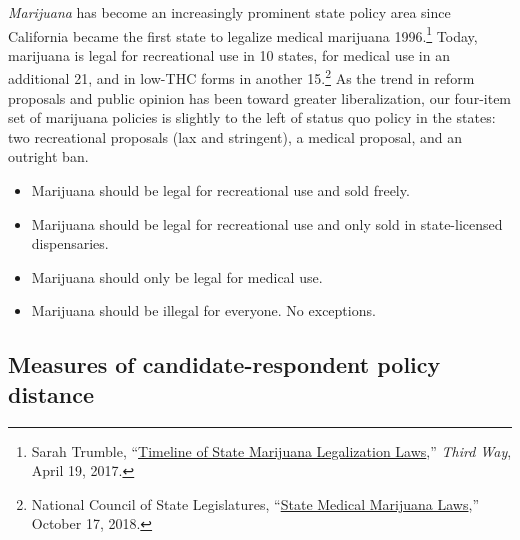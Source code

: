 \documentclass[12pt]{article}
\begin{document}
\textit{Marijuana} has become an increasingly prominent state policy area since California became the first state to legalize medical marijuana 1996.\footnote{Sarah Trumble, ``\href{https://www.thirdway.org/infographic/timeline-of-state-marijuana-legalization-laws}{Timeline of State Marijuana Legalization Laws},'' \emph{Third Way}, April 19, 2017.} Today, marijuana is legal for recreational use in 10 states, for medical use in an additional 21, and in low-THC forms in another 15.\footnote{National Council of State Legislatures, ``\href{http://www.ncsl.org/research/health/state-medical-marijuana-laws.aspx}{State Medical Marijuana Laws},'' October 17, 2018.} As the trend in reform proposals and public opinion has been toward greater liberalization, our four-item set of marijuana policies is slightly to the left of status quo policy in the states: two recreational proposals (lax and stringent), a medical proposal, and an outright ban.

\begin{itemize}
\setlength\itemsep{-.25em}
\singlespacing
\item Marijuana should be legal for recreational use and sold freely.
\item Marijuana should be legal for recreational use and only sold in state-licensed dispensaries.
\item Marijuana should only be legal for medical use.
\item Marijuana should be illegal for everyone. No exceptions.
\end{itemize}

\clearpage
\newpage

\subsection{Measures of candidate-respondent policy distance\label{sec:altMeasures}}

\singlespacing
\end{document}
